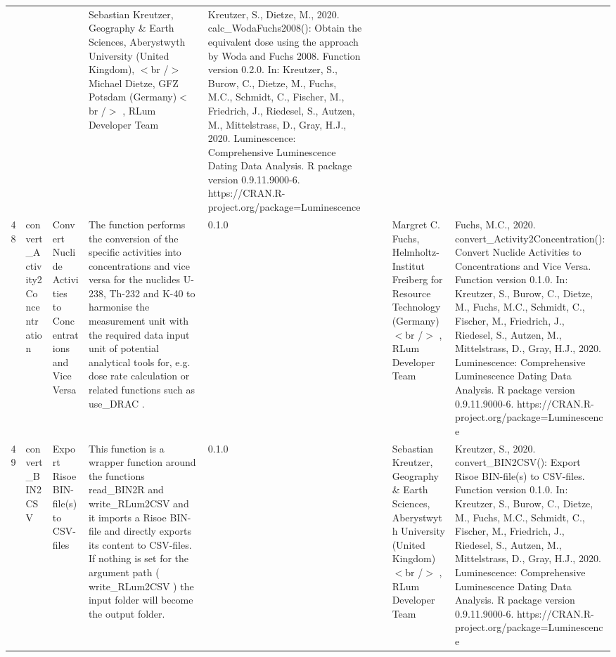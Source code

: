 \begin{table}[ht]
\begin{tabular}{rllllllll}
 &  &  & Sebastian Kreutzer, Geography \& Earth Sciences, Aberystwyth University (United Kingdom), $<$br /$>$ Michael Dietze, GFZ Potsdam (Germany)$<$br /$>$ , RLum Developer Team & Kreutzer, S., Dietze, M., 2020. calc\_WodaFuchs2008(): Obtain the equivalent dose using the approach by Woda and Fuchs 2008. Function version 0.2.0. In: Kreutzer, S., Burow, C., Dietze, M., Fuchs, M.C., Schmidt, C., Fischer, M., Friedrich, J., Riedesel, S., Autzen, M., Mittelstrass, D., Gray, H.J., 2020. Luminescence: Comprehensive Luminescence Dating Data Analysis. R package version 0.9.11.9000-6. https://CRAN.R-project.org/package=Luminescence
 \\ 
  48 & convert\_Activity2Concentration & Convert Nuclide Activities to Concentrations and Vice Versa & The function performs the conversion of the specific activities into concentrations and vice versa for the nuclides U-238, Th-232 and K-40 to harmonise the measurement unit with the required data input unit of potential analytical tools for, e.g. dose rate calculation or related functions such as  use\_DRAC . & 0.1.0
 &  &  & Margret C. Fuchs, Helmholtz-Institut Freiberg for Resource Technology (Germany)$<$br /$>$ , RLum Developer Team & Fuchs, M.C., 2020. convert\_Activity2Concentration(): Convert Nuclide Activities to Concentrations and Vice Versa. Function version 0.1.0. In: Kreutzer, S., Burow, C., Dietze, M., Fuchs, M.C., Schmidt, C., Fischer, M., Friedrich, J., Riedesel, S., Autzen, M., Mittelstrass, D., Gray, H.J., 2020. Luminescence: Comprehensive Luminescence Dating Data Analysis. R package version 0.9.11.9000-6. https://CRAN.R-project.org/package=Luminescence
 \\ 
  49 & convert\_BIN2CSV & Export Risoe BIN-file(s) to CSV-files & This function is a wrapper function around the functions  read\_BIN2R  and write\_RLum2CSV  and it imports a Risoe BIN-file and directly exports its content to CSV-files. If nothing is set for the argument  path  ( write\_RLum2CSV ) the input folder will become the output folder. & 0.1.0
 &  &  & Sebastian Kreutzer, Geography \& Earth Sciences, Aberystwyth University (United Kingdom)$<$br /$>$ , RLum Developer Team & Kreutzer, S., 2020. convert\_BIN2CSV(): Export Risoe BIN-file(s) to CSV-files. Function version 0.1.0. In: Kreutzer, S., Burow, C., Dietze, M., Fuchs, M.C., Schmidt, C., Fischer, M., Friedrich, J., Riedesel, S., Autzen, M., Mittelstrass, D., Gray, H.J., 2020. Luminescence: Comprehensive Luminescence Dating Data Analysis. R package version 0.9.11.9000-6. https://CRAN.R-project.org/package=Luminescence
 \\ 

\end{tabular}
\end{table}
